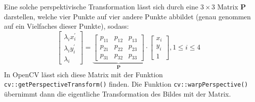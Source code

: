\documentclass{whswinvcbook}
\begin{document}
Eine solche perspektivische Transformation lässt sich durch eine $3\times3$ Matrix $\mathbf{P}$ darstellen, welche vier Punkte auf vier andere Punkte abbildet (genau genommen auf ein Vielfaches dieser Punkte), sodass: $$\begin{bmatrix}\lambda_i x_i^\prime\\\lambda_i y_i^\prime\\\lambda_i\end{bmatrix}=\underbrace{\begin{bmatrix}p_{11}&p_{12}&p_{13}\\p_{21}&p_{22}&p_{23}\\p_{31}&p_{32}&p_{33}\end{bmatrix}}_{\mathbf{P}}\cdot\begin{bmatrix}x_i\\y_i\\1\end{bmatrix},1\leq i\leq4$$
In OpenCV lässt sich diese Matrix mit der Funktion \texttt{cv::getPerspectiveTransform()} finden. Die Funktion \texttt{cv::warpPerspective()} übernimmt dann die eigentliche Transformation des Bildes mit der Matrix.
\end{document}
